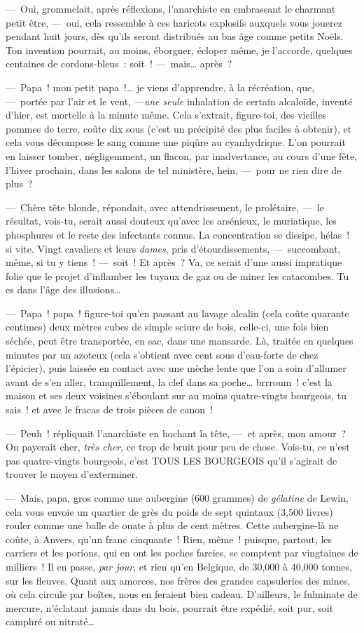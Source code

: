 \documentclass[french,twoside]{book} %
\begin{document}
— Oui, grommelait, après réflexions, l’anarchiste en embrassant le charmant petit être, — oui, cela ressemble à ces haricots explosifs auxquels vous jouerez pendant huit jours, dès qu’ils seront distribués au bas âge comme petits Noëls. Ton invention pourrait, au moins, éborgner, écloper même, je l’accorde, quelques centaines de cordons-bleus : soit ! — mais… après ?\par
— Papa ! mon petit papa !… je viens d’apprendre, à la récréation, que, — portée par l’air et le vent, —\emph{une seule} inhalation de certain alcaloïde, inventé d’hier, est mortelle à la minute   même. Cela s’extrait, figure-toi, des vieilles pommes de terre, coûte dix sous (c’est un précipité des plus faciles à obtenir), et cela vous décompose le sang comme une piqûre au cyanhydrique. L’on pourrait en laisser tomber, négligemment, un flacon, par inadvertance, au cours d’une fête, l’hiver prochain, dans les salons de tel ministère, hein, — pour ne rien dire de plus ?\par
— Chère tête blonde, répondait, avec attendrissement, le prolétaire, — le résultat, vois-tu, serait aussi douteux qu’avec les arsénieux, le muriatique, les phosphures et le reste des infectants connus. La concentration se dissipe, hélas ! si vite. Vingt cavaliers et leurs \emph{dames}, pris d’étourdissements, — succombant, même, si tu y tiens ! — soit ! Et après ? Va, ce serait d’une aussi impratique folie que le projet d’inflamber les tuyaux de gaz ou de miner les catacombes. Tu es dans l’âge des illusions…\par
— Papa ! papa ! figure-toi qu’en passant au lavage alcalin (cela coûte quarante centimes) deux mètres cubes de simple sciure de bois,   celle-ci, une fois bien séchée, peut être transportée, en sac, dans une mansarde. Là, traitée en quelques minutes par un azoteux (cela s’obtient avec cent sous d’eau-forte de chez l’épicier), puis laissée en contact avec une mèche lente que l’on a soin d’allumer avant de s’en aller, tranquillement, la clef dans sa poche… brrroum ! c’est la maison et ses deux voisines s’éboulant sur au moins quatre-vingts bourgeois, tu sais ! et avec le fracas de trois pièces de canon !\par
— Peuh ! répliquait l’anarchiste en hochant la tête, — et après, mon amour ? On payerait cher, \emph{très cher}, ce trop de bruit pour peu de chose. Vois-tu, ce n’est pas quatre-vingts bourgeois, c’est TOUS LES BOURGEOIS qu’il s’agirait de trouver le moyen d’exterminer.\par
— Mais, papa, gros comme une aubergine (600 grammes) de \emph{gélatine} de Lewin, cela vous envoie un quartier de grès du poids de sept quintaux (3,500 livres) rouler comme une balle de ouate à plus de cent mètres. Cette aubergine-là ne coûte, à Anvers, qu’un franc cinquante !   Rien, même ! puisque, partout, les carriers et les porions, qui en ont les poches farcies, se comptent par vingtaines de milliers ! Il en passe, \emph{par jour}, et rien qu’en Belgique, de 30,000 à 40,000 tonnes, sur les fleuves. Quant aux amorces, nos frères des grandes capsuleries des mines, où cela circule par boîtes, nous en feraient bien cadeau. D’ailleurs, le fulminate de mercure, n’éclatant jamais dans du bois, pourrait être expédié, soit pur, soit camphré ou nitraté…\par
\end{document}
